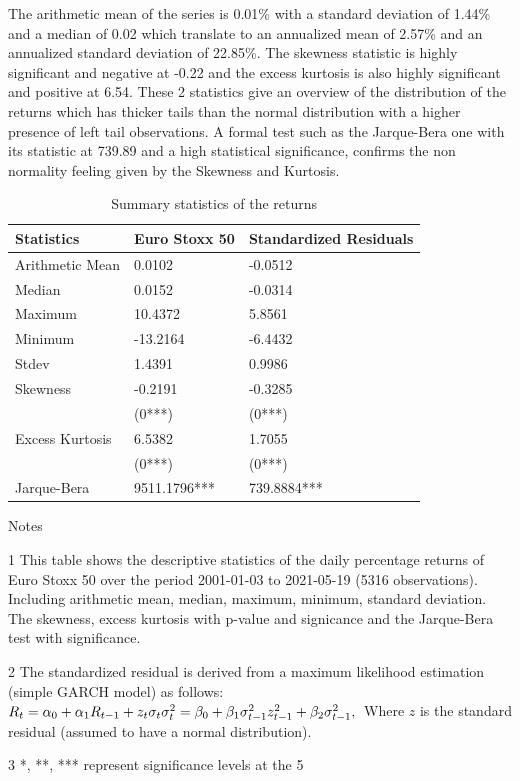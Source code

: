 \documentclass[a4paper, nobind]{templates/ociamthesis}
\begin{document}
\noindent The arithmetic mean of the series is 0.01\% with a standard deviation of 1.44\% and a median of 0.02 which translate to an annualized mean of 2.57\% and an annualized standard deviation of 22.85\%. The skewness statistic is highly significant and negative at -0.22 and the excess kurtosis is also highly significant and positive at 6.54. These 2 statistics give an overview of the distribution of the returns which has thicker tails than the normal distribution with a higher presence of left tail observations. A formal test such as the Jarque-Bera one with its statistic at 739.89 and a high statistical significance, confirms the non normality feeling given by the Skewness and Kurtosis.~\\

\begin{table}[h!]

\caption{\label{tab:dsTable}Summary statistics of the returns}
\centering
\begin{threeparttable}
\begin{tabular}[t]{lll}
\toprule
Statistics & Euro Stoxx 50 & Standardized Residuals\\
\midrule
Arithmetic Mean & 0.0102 & -0.0512\\
Median & 0.0152 & -0.0314\\
Maximum & 10.4372 & 5.8561\\
Minimum & -13.2164 & -6.4432\\
Stdev & 1.4391 & 0.9986\\
\addlinespace
Skewness & -0.2191 & -0.3285\\
 & (0***) & (0***)\\
Excess Kurtosis & 6.5382 & 1.7055\\
 & (0***) & (0***)\\
Jarque-Bera & 9511.1796*** & 739.8884***\\
\bottomrule
\end{tabular}
\begin{tablenotes}
\item Notes
\item[1] This table shows the descriptive statistics of the daily percentage returns of Euro Stoxx 50 over the period 2001-01-03 to 2021-05-19 (5316 observations). Including arithmetic mean, median, maximum, minimum, standard deviation. The skewness, excess kurtosis with p-value and signicance and the Jarque-Bera test with significance.
\item[2] The standardized residual is derived from a maximum likelihood estimation (simple GARCH model) as follows:  $ R_t=\alpha_0+\alpha_1 R_{t-1}+z_t \sigma_t \\ \sigma_t^2=\beta_0+\beta_1 \sigma_{t-1}^2 z_{t-1}^2+\beta_2 \sigma_{t-1}^2, \\$ Where $z$ is the standard residual (assumed to have a normal distribution).
\item[3] *, **, *** represent significance levels at the 5%
\end{tablenotes}
\end{threeparttable}
\end{table}
\end{document}
